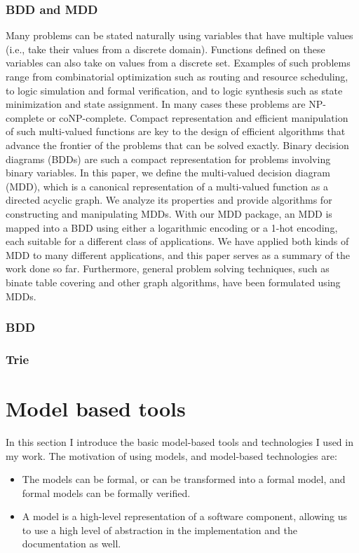\subsubsection{BDD and MDD}

Many problems can be stated naturally using variables that have multiple values (i.e., take their values from a discrete domain). Functions defined on these variables can also take on values from a discrete set. Examples of such problems range from combinatorial optimization such as routing and resource scheduling, to logic simulation and formal verification, and to logic synthesis such as state minimization and state assignment. In many cases these problems are NP-complete or coNP-complete. Compact representation and efficient manipulation of such multi-valued functions are key to the design of efficient algorithms that advance the frontier of the problems that can be solved exactly. Binary decision diagrams (BDDs) are such a compact representation for problems involving binary variables. In this paper, we define the multi-valued decision diagram (MDD), which is a canonical representation of a multi-valued function as a directed acyclic graph. We analyze its properties and provide algorithms for constructing and manipulating MDDs. With our MDD package, an MDD is mapped into a BDD using either a logarithmic encoding or a 1-hot encoding, each suitable for a different class of applications. We have applied both kinds of MDD to many different applications, and this paper serves as a summary of the work done so far. Furthermore, general problem solving techniques, such as binate table covering and other graph algorithms, have been formulated using MDDs.\citep{Kam98mdd}

\subsubsection{BDD}


\subsubsection{Trie}



\section{Model based tools}
In this section I introduce the basic model-based tools and technologies I used in my work. The motivation of using models, and model-based technologies are:
\begin{itemize}
	\item The models can be formal, or can be transformed into a formal model, and formal models can be formally verified.
	\item A model is a high-level representation of a software component, allowing us to use a high level of abstraction in the implementation and the documentation as well.
\end{itemize}

